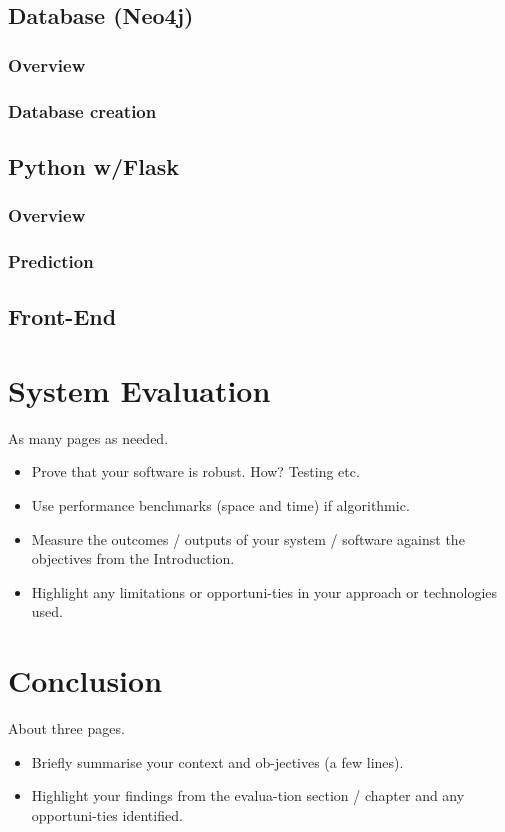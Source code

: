 \section{Database (Neo4j)}
\subsection{Overview}
\subsection{Database creation}
\section{Python w/Flask}
\subsection{Overview}
\subsection{Prediction}	
\section{Front-End}

\chapter{System Evaluation}
As many pages as needed.
\begin{itemize}
\item Prove that your software is robust. How? Testing etc. 
\item Use performance benchmarks (space and time) if algorithmic.
\item Measure the outcomes / outputs of your system / software against the objectives from the Introduction.
\item Highlight any limitations or opportuni-ties in your approach or technologies used.
\end{itemize}

\chapter{Conclusion}
About three pages.

\begin{itemize}
\item Briefly summarise your context and ob-jectives (a few lines).
\item Highlight your findings from the evalua-tion section / chapter and any opportuni-ties identified.
\end{itemize}

